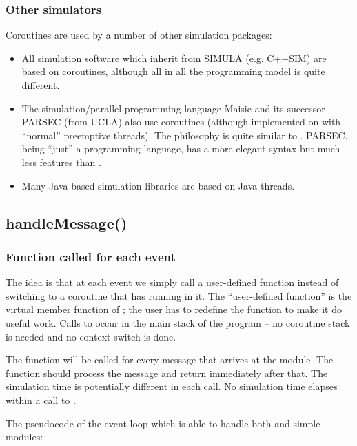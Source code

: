 \subsubsection{Other simulators}


Coroutines are used by a number of other simulation packages:
\begin{itemize}
\item{All simulation software which inherit from SIMULA (e.g. C++SIM)
    are based on coroutines, although all in all the programming
    model is quite different.}
\item{The simulation/parallel programming language Maisie and its successor
    PARSEC (from UCLA) also use coroutines (although implemented
    on with ``normal'' preemptive threads). The philosophy
    is quite similar to {\opp}. PARSEC, being ``just''
    a programming language, has a more elegant syntax but much less
    features than {\opp}.}
\item{Many Java-based simulation libraries are based on Java
    threads.}
\end{itemize}



\subsection{handleMessage()}

\subsubsection{Function called for each event}


The idea is that at each event we simply call a
user-defined function instead of switching to a coroutine that has
 running in it. The ``user-defined function'' is the
 virtual member
function of ; the user has to redefine the
function to make it do useful work.  Calls to 
occur in the main stack of the program -- no coroutine stack is needed
and no context switch is done.


The  function will be called for every message
that arrives at the module. The function should process the message
and return immediately after that. The simulation time is potentially
different in each call. No simulation time elapses within a call
to .

The pseudocode of the event loop which is able to handle both 
and  simple modules:

